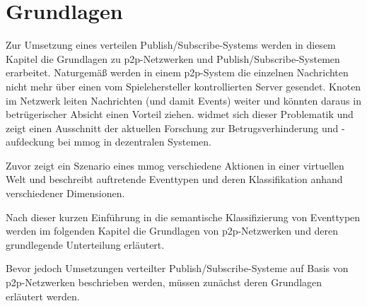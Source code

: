 \chapter{Grundlagen}
\label{chap:grundlagen}

Zur Umsetzung eines verteilen Publish/Subscribe-Systems werden in diesem Kapitel die Grundlagen zu \ac{p2p}-Netzwerken und Publish/Subscribe-Systemen erarbeitet. Naturgemäß werden in einem \ac{p2p}-System die einzelnen Nachrichten nicht mehr über einen vom Spielehersteller kontrollierten Server gesendet. Knoten im Netzwerk leiten Nachrichten (und damit Events) weiter und könnten daraus in betrügerischer Absicht einen Vorteil ziehen.  widmet sich dieser Problematik und zeigt einen Ausschnitt der aktuellen Forschung zur Betrugsverhinderung und -aufdeckung bei \ac{mmog} in dezentralen Systemen.

Zuvor zeigt ein Szenario eines \ac{mmog} verschiedene Aktionen in einer virtuellen Welt und beschreibt auftretende Eventtypen und deren Klassifikation anhand verschiedener Dimensionen.



Nach dieser kurzen Einführung in die semantische Klassifizierung von Eventtypen werden im folgenden Kapitel die Grundlagen von \ac{p2p}-Netzwerken und deren grundlegende Unterteilung erläutert.







Bevor jedoch Umsetzungen verteilter Publish/Subscribe-Systeme auf Basis von \ac{p2p}-Netzwerken beschrieben werden, müssen zunächst deren Grundlagen erläutert werden.


